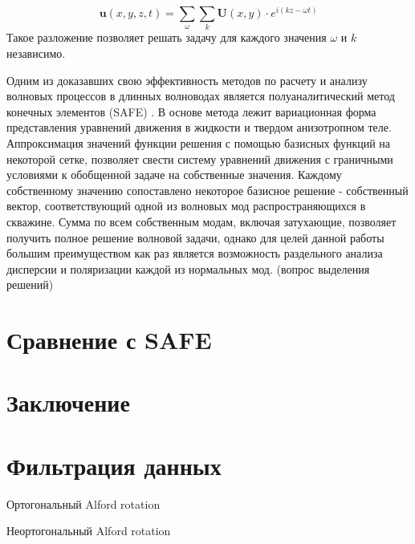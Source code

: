 \documentclass[a4paper,11pt]{article}
\begin{document}
$$
	\mathbf{u}(x,y,z,t) = \sum_{\omega} \sum_{k} \mathbf{U}(x,y)\cdot e^{i(kz - \omega t)}
$$
Такое разложение позволяет решать задачу для каждого значения $\omega$ и $k$ независимо. 

Одним из доказавших свою эффективность методов по расчету и анализу волновых процессов в длинных волноводах является полуаналитический метод конечных элементов (SAFE) \cite{Bartoli2006}. В основе метода лежит вариационная форма представления уравнений движения в жидкости и твердом анизотропном теле. Аппроксимация значений функции решения с помощью базисных функций на некоторой сетке, позволяет свести систему уравнений движения с граничными условиями к обобщенной задаче на собственные значения. Каждому собственному значению сопоставлено некоторое базисное решение - собственный вектор, соответствующий одной из волновых мод распространяющихся в скважине. Сумма по всем собственным модам, включая затухающие, позволяет получить полное решение волновой задачи, однако для целей данной работы большим преимуществом как раз является возможность раздельного анализа дисперсии и поляризации каждой из нормальных мод. (вопрос выделения решений)

\section{Сравнение с SAFE}

\section{Заключение}

%







\section{Фильтрация данных}

\begin{minipage}[c]{0.47\linewidth}	
\begin{center}
		Ортогональный Alford rotation \\
	  		\label{fig:rot4_scheme}
\end{center}	  		
\end{minipage} \hfill
\begin{minipage}[c]{0.47\linewidth}
\begin{center}
		Неортогональный Alford rotation\\
			\label{fig:rot4_gs_scheme}
\end{center}
\end{minipage} 	\\
\end{document}
